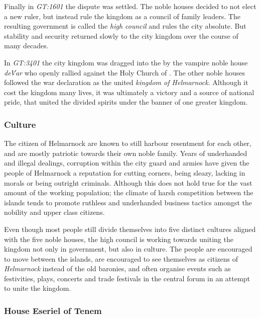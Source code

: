 Finally in \emph{GT:1601} the dispute was settled. The noble houses decided
to not elect a new ruler, but instead rule the kingdom as a council of family
leaders. The resulting government is called the \emph{high council} and rules
the city absolute. But stability and security returned slowly to the city
kingdom over the course of many decades.

In \emph{GT:3401} the city kingdom was dragged into the
 by the vampire noble house \emph{de\'Var} who openly
rallied against the Holy Church of . The other noble
houses followed the war declaration as the united \emph{kingdom of
  Helmarnock}. Although it cost the kingdom many lives, it was ultimately a
victory and a source of national pride, that united the divided spirits under
the banner of one greater kingdom.

\subsubsection*{Culture}


The citizen of Helmarnock are known to still harbour resentment for each other,
and are mostly patriotic towards their own noble family. Years of underhanded
and illegal dealings, corruption within the city guard and armies have given
the people of Helmarnock a reputation for cutting corners, being sleazy,
lacking in morals or being outright criminals. Although this does not hold
true for the vast amount of the working population; the climate of harsh
competition between the islands tends to promote ruthless and underhanded
business tactics amongst the nobility and upper class citizens.

Even though most people still divide themselves into five distinct cultures
aligned with the five noble houses, the high council is working towards
uniting the kingdom not only in government, but also in culture. The people
are encouraged to move between the islands, are encouraged to see themselves
as citizens of \emph{Helmarnock} instead of the old baronies, and often organise
events such as festivities, plays, concerts and trade festivals in the central
forum in an attempt to unite the kingdom.

\subsubsection*{House Eseriel of Tenem}
\label{sec:House Eseriel}

